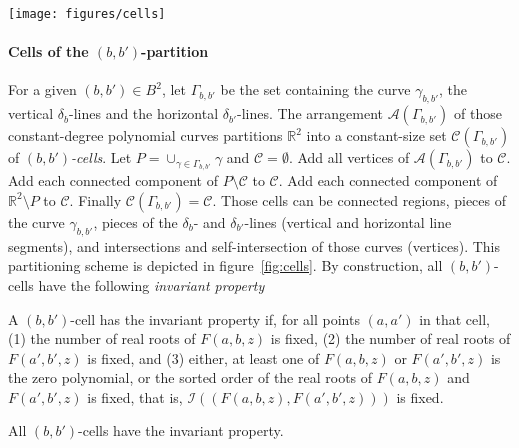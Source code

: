\begin{figure*}
\centering
\texttt{[image: figures/cells]}
\caption{Cells obtained after partitioning the plane using
the curve $\gamma_{b,b'}$ and the
$\delta_b$ and $\delta_{b'}$-lines. The five darkened regions highlight examples of
$(b,b')$-cells.}\label{fig:cells}
\end{figure*}


\paragraph{Cells of the $(b,b')$-partition}
For a given $(b,b') \in B^2$, let $\Gamma_{b,b'}$ be the set containing
the curve $\gamma_{b,b'}$, the vertical
$\delta_b$-lines and the horizontal $\delta_{b'}$-lines.
The arrangement $\mathcal{A}(\Gamma_{b,b'})$ of those
constant-degree polynomial curves partitions $\mathbb{R}^2$ into a
constant-size set $\mathcal{C}(\Gamma_{b,b'})$ of \emph{$(b,b')$-cells}.
Let $P = \cup_{\gamma \in \Gamma_{b,b'}} \gamma$ and
$\mathcal{C} = \emptyset$. Add all
vertices of $\mathcal{A}(\Gamma_{b,b'})$ to
$\mathcal{C}$. Add each connected component of $P \setminus \mathcal{C}$ to
$\mathcal{C}$. Add each connected component of $\mathbb{R}^2 \setminus P$ to
$\mathcal{C}$. Finally $\mathcal{C}(\Gamma_{b,b'}) = \mathcal{C}$.
Those cells
can be connected regions,
pieces of the curve $\gamma_{b,b'}$, pieces of the $\delta_b$- and
$\delta_{b'}$-lines (vertical and horizontal line segments), and
intersections and self-intersection of those curves (vertices).
This partitioning scheme is depicted in figure~\ref{fig:cells}.
%
By construction, all $(b,b')$-cells have the following \emph{invariant property}
\begin{definition}
    A $(b,b')$-cell has the invariant property if, for all points $(a,a')$ in
    that cell, (1) the number of real roots of $F(a,b,z)$ is fixed, (2)
    the number of real roots of $F(a',b',z)$ is fixed,
    and (3) either, at least one of \(F(a,b,z)\) or \(F(a',b',z)\) is the zero
    polynomial, or the sorted order of the real roots of $F(a,b,z)$ and
    $F(a',b',z)$ is fixed, that is,
    $\mathcal{I}((F(a,b,z),F(a',b',z)))$ is fixed.
\end{definition}
\begin{lemma}
    All $(b,b')$-cells have the invariant property.
\end{lemma}
